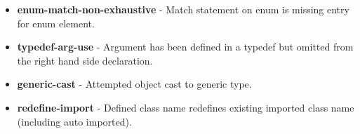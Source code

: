 \documentclass[conc-doc]{subfiles}
\begin{document}
\begin{itemize}
	\item \textbf{enum-match-non-exhaustive} - Match statement on enum is missing entry for enum element.
	\item \textbf{typedef-arg-use} - Argument has been defined in a typedef but omitted from the right hand side declaration.
	\item \textbf{generic-cast} - Attempted object cast to generic type.
	\item \textbf{redefine-import} - Defined class name redefines existing imported class name (including auto imported).
\end{itemize}
\end{document}
